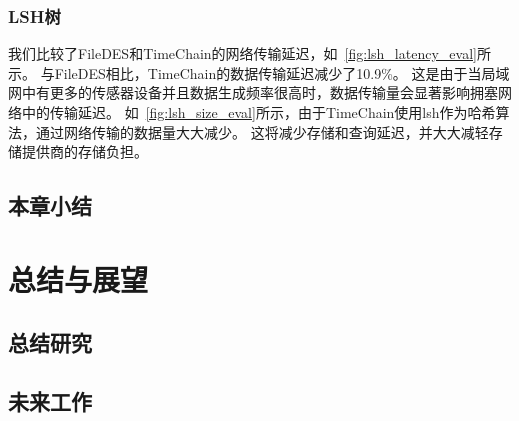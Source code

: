 \subsection{LSH树}
我们比较了FileDES和TimeChain的网络传输延迟，如~\autoref{fig:lsh_latency_eval}所示。
与FileDES相比，TimeChain的数据传输延迟减少了10.9\%。
这是由于当局域网中有更多的传感器设备并且数据生成频率很高时，数据传输量会显著影响拥塞网络中的传输延迟。
如~\autoref{fig:lsh_size_eval}所示，由于TimeChain使用lsh作为哈希算法，通过网络传输的数据量大大减少。
这将减少存储和查询延迟，并大大减轻存储提供商的存储负担。

\section{本章小结}

\chapter{总结与展望}
\section{总结研究}
\section{未来工作}
